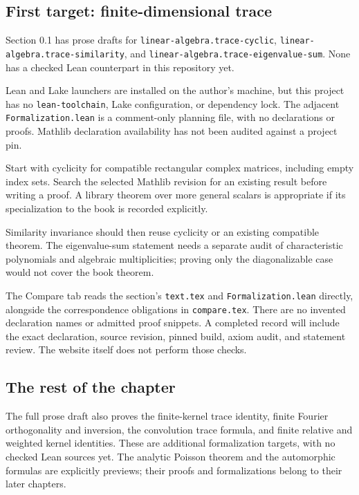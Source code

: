 \subsection{First target: finite-dimensional trace}\label{first-target-finite-dimensional-trace}

Section 0.1 has prose drafts for \texttt{linear-algebra.trace-cyclic}, \texttt{linear-algebra.trace-similarity}, and \texttt{linear-algebra.trace-eigenvalue-sum}. None has a checked Lean counterpart in this repository yet.

Lean and Lake launchers are installed on the author's machine, but this project has no \texttt{lean-toolchain}, Lake configuration, or dependency lock. The adjacent \texttt{Formalization.lean} is a comment-only planning file, with no declarations or proofs. Mathlib declaration availability has not been audited against a project pin.

Start with cyclicity for compatible rectangular complex matrices, including empty index sets. Search the selected Mathlib revision for an existing result before writing a proof. A library theorem over more general scalars is appropriate if its specialization to the book is recorded explicitly.

Similarity invariance should then reuse cyclicity or an existing compatible theorem. The eigenvalue-sum statement needs a separate audit of characteristic polynomials and algebraic multiplicities; proving only the diagonalizable case would not cover the book theorem.

The Compare tab reads the section's \texttt{text.tex} and \texttt{Formalization.lean} directly, alongside the correspondence obligations in \texttt{compare.tex}. There are no invented declaration names or admitted proof snippets. A completed record will include the exact declaration, source revision, pinned build, axiom audit, and statement review. The website itself does not perform those checks.

\subsection{The rest of the chapter}\label{chapter-zero-formalization-roadmap}

The full prose draft also proves the finite-kernel trace identity, finite Fourier orthogonality and inversion, the convolution trace formula, and finite relative and weighted kernel identities. These are additional formalization targets, with no checked Lean sources yet. The analytic Poisson theorem and the automorphic formulas are explicitly previews; their proofs and formalizations belong to their later chapters.

